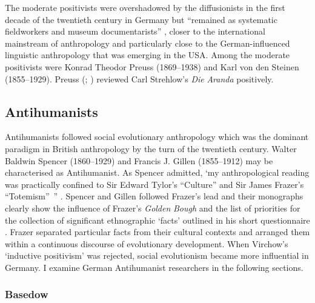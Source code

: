 \documentclass[output=paper]{langsci/langscibook}
\begin{document}
The moderate positivists were overshadowed by the diffusionists in the first decade of the twentieth century in Germany but “remained as systematic fieldworkers and museum documentarists” \citep[92]{barth_german-speaking_2005}, closer to the international mainstream of anthropology and particularly close to the German-influenced linguistic anthropology that was emerging in the USA. Among the moderate positivists were Konrad Theodor Preuss (1869--1938) and Karl von den Steinen (1855--1929). Preuss (\citeyear{preuss_review_1908}; \citeyear{preuss_geographie_1909}) reviewed Carl Strehlow’s \textit{Die} \textit{Aranda} positively. 

\subsection{Antihumanists}

Antihumanists followed social evolutionary anthropology which was the dominant paradigm in British anthropology by the turn of the twentieth century. Walter Baldwin Spencer (1860--1929) and Francis J. Gillen (1855--1912) may be characterised as Antihumanist. As Spencer admitted, ‘my anthropological reading was practically confined to Sir Edward Tylor’s “Culture” and Sir James Frazer’s “Totemism”~” \citep[184]{spencer_wanderings_1928}. Spencer and Gillen followed Frazer’s lead and their monographs clearly show the influence of Frazer’s \textit{Golden} \textit{Bough} and the list of priorities for the collection of significant ethnographic ‘facts’ outlined in his short questionnaire \citep[45]{urry_before_1993}. Frazer separated particular facts from their cultural contexts and arranged them within a continuous discourse of evolutionary development. When Virchow’s ‘inductive positivism’ \citep[138]{stocking_virchow_1996} was rejected, social evolutionism became more influential in Germany. I examine German Antihumanist researchers in the following sections. 

\subsubsection{Basedow}
\end{document}
